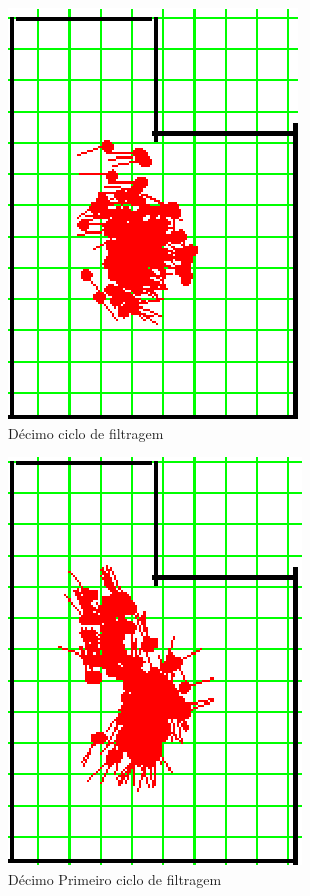 \begin{figure}[H]
  \centering
  \includegraphics[scale=0.6]{figuras/cen1_ex3/11.eps}
  \caption[Décimo Ciclo de Filtragem]{Décimo ciclo de filtragem}
  \label{img:cen1_ex3_11}
\end{figure}

\begin{figure}[H]
  \centering
  \includegraphics[scale=0.6]{figuras/cen1_ex3/12.eps}
  \caption[Décimo Primeiro Ciclo de Filtragem]{Décimo Primeiro ciclo de filtragem}
  \label{img:cen1_ex3_12}
\end{figure}

